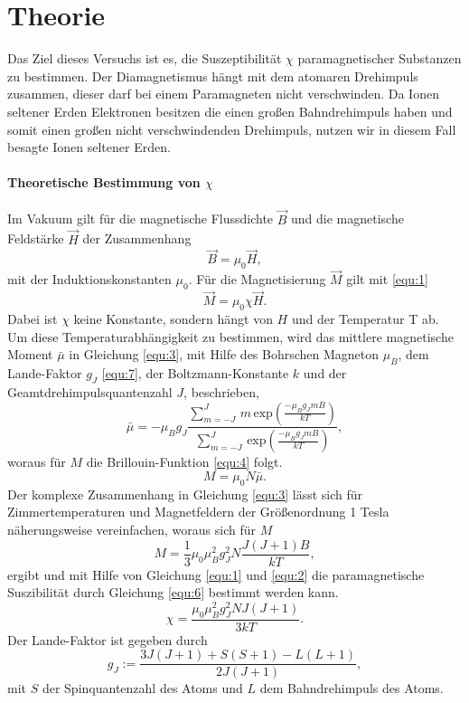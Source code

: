 \section{Theorie}
\label{sec:Theorie}
Das Ziel dieses Versuchs ist es, die Suszeptibilität $\chi$ paramagnetischer Substanzen zu bestimmen.
Der Diamagnetismus hängt mit dem atomaren Drehimpuls zusammen, dieser darf bei einem Paramagneten nicht verschwinden. 
Da Ionen seltener Erden Elektronen besitzen die einen großen Bahndrehimpuls haben und somit einen großen nicht verschwindenden 
Drehimpuls, nutzen wir in diesem Fall besagte Ionen seltener Erden.

\paragraph{Theoretische Bestimmung von $\chi$}
Im Vakuum gilt für die magnetische Flussdichte $\vec{B}$ und die magnetische Feldstärke $\vec{H}$ der Zusammenhang 
\begin{equation}
    \label{equ:1}
    \vec{B} = \mu_0 \vec{H},
\end{equation}
mit der Induktionskonstanten $\mu_0$.
Für die Magnetisierung $\vec{M}$ gilt mit \eqref{equ:1}
\begin{equation}
    \label{equ:2}
    \vec{M} = \mu_0 \chi \vec{H}.
\end{equation}
Dabei ist $\chi$ keine Konstante, sondern hängt von $H$ und der Temperatur T ab.
Um diese Temperaturabhängigkeit zu bestimmen, wird das mittlere magnetische Moment $\bar{\mu}$ in Gleichung \eqref{equ:3},
mit Hilfe des Bohrschen Magneton $\mu_B$, dem Lande-Faktor $g_J$ \eqref{equ:7}, der Boltzmann-Konstante $k$ und der Geamtdrehimpulsquantenzahl $J$,
beschrieben,
\begin{equation}
    \label{equ:3}
    \bar{\mu} = - \mu_B g_J \frac{\sum_{m = -J}^{J}\, m\, \text{exp}\left( \frac{-\mu_B g_J mB}{k T}\right)} {\sum_{m = -J}^{J}\, \text{exp}\left( \frac{-\mu_B g_J mB}{k T}\right)},
\end{equation}
woraus für $M$ die Brillouin-Funktion \eqref{equ:4} folgt.
\begin{equation}
    \label{equ:4}
    M = \mu_0 N \bar{\mu}.
\end{equation}
Der komplexe Zusammenhang in Gleichung \eqref{equ:3} lässt sich für Zimmertemperaturen und Magnetfeldern der Größenordnung 1 Tesla 
näherungsweise vereinfachen, woraus sich für $M$ 
\begin{equation}
    \label{equ:5}
    M = \frac{1}{3} \mu_0 \mu_B^2 g_J^2 N \frac{J(J + 1) B}{k T},
\end{equation}
ergibt und mit Hilfe von Gleichung \eqref{equ:1} und \eqref{equ:2} die paramagnetische Suszibilität durch Gleichung \eqref{equ:6} bestimmt werden kann.
\begin{equation}
    \label{equ:6}
    \chi = \frac{\mu_0 \mu_B^2 g_J^2 N J (J + 1)}{3 k T}.
\end{equation}
Der Lande-Faktor ist gegeben durch 
\begin{equation}
    \label{equ:7}
    g_J := \frac{3 J(J + 1) + {S(S+1) - L(L+1)}}{2 J(J+1)},
\end{equation}
mit $S$ der Spinquantenzahl des Atoms und  $L$ dem Bahndrehimpuls des Atoms.

